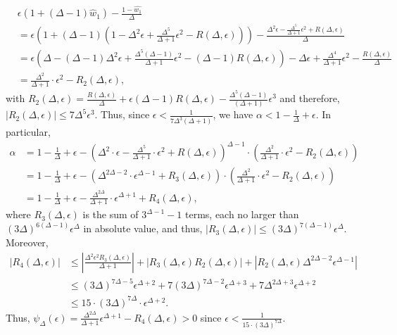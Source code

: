 \documentclass[11pt]{article}
\begin{document}
\begin{appendixproof}
\begin{align*}
&\epsilon(1+(\Delta-1)\hat{w}_1) - \frac{1-\hat{w_1}}{\Delta} \\
&= \epsilon\left(1 + (\Delta-1)\left(1 - \Delta^2\epsilon + \frac{\Delta^5}{\Delta+1}\epsilon^2 - R(\Delta,\epsilon)\right)\right) - \frac{\Delta^2\epsilon - \frac{\Delta^5}{\Delta+1}\epsilon^2 + R(\Delta,\epsilon)}{\Delta}\\
& = \epsilon\left(\Delta - (\Delta-1)\Delta^2\epsilon +\frac{\Delta^5(\Delta-1)}{\Delta+1}\epsilon^2 - (\Delta-1)R(\Delta,\epsilon) \right) - \Delta\epsilon + \frac{\Delta^4}{\Delta+1}\epsilon^2- \frac{R(\Delta,\epsilon)}{\Delta}\\
& =\frac{\Delta^2}{\Delta+1} \cdot \epsilon^2 - R_2(\Delta, \epsilon), 
\end{align*}
with $R_2(\Delta,\epsilon) = \frac{R(\Delta,\epsilon)}{\Delta} + \epsilon(\Delta-1)R(\Delta,\epsilon)  - \frac{\Delta^5(\Delta-1)}{(\Delta+1)}\epsilon^3$ and therefore, $|R_2(\Delta,\epsilon)|\leq 7\Delta^5\epsilon^3$.
Thus, since $\epsilon < \frac{1}{7\Delta^3(\Delta+1)}$, we have $\alpha < 1 -\frac{1}{\Delta} + \epsilon$. In particular,
\begin{align*}
\alpha &=  1 - \frac1{\Delta} + \epsilon - \left(\Delta^2 \cdot \epsilon - \frac{\Delta^5}{\Delta+1} \cdot \epsilon^2 + R(\Delta,\epsilon)\right)^{\Delta - 1} \cdot \left(\frac{\Delta^2}{\Delta+1} \cdot \epsilon^2 - R_2(\Delta,\epsilon)\right) \\
&=1 - \frac1{\Delta} + \epsilon - \left(\Delta^{2\Delta-2} \cdot \epsilon^{\Delta-1} +R_3(\Delta,\epsilon)\right) \cdot \left(\frac{\Delta^2}{\Delta+1} \cdot \epsilon^2 - R_2(\Delta,\epsilon)\right) \\
&= 1 - \frac1{\Delta} + \epsilon - \frac{\Delta^{2\Delta}}{\Delta+1} \cdot \epsilon^{\Delta+1} + R_4(\Delta,\epsilon),
\end{align*}
where $R_3(\Delta,\epsilon)$ is the sum of $3^{\Delta-1}-1$ terms, each no larger than $(3\Delta)^{6(\Delta-1)}\epsilon^{\Delta}$ in absolute value, and thus, $|R_3(\Delta,\epsilon)|\leq (3\Delta)^{7(\Delta-1)}\epsilon^\Delta$. Moreover,
\begin{align*}
|R_4(\Delta,\epsilon)| &\leq \left|\frac{\Delta^2 \epsilon^2 R_3(\Delta,\epsilon)}{\Delta+1}\right| + \left|R_3(\Delta,\epsilon)R_2(\Delta,\epsilon)\right| + \left|R_2(\Delta,\epsilon)\Delta^{2\Delta-2}\epsilon^{\Delta-1}\right|\\
& \leq (3\Delta)^{7\Delta-5}\epsilon^{\Delta+2} + 7(3\Delta)^{7\Delta-2}\epsilon^{\Delta+3} + 7\Delta^{2\Delta+3}\epsilon^{\Delta+2}\\
&\leq 15\cdot (3\Delta)^{7\Delta} \cdot \epsilon^{\Delta+2}.
\end{align*}
Thus, $\psi_\Delta(\epsilon) = \frac{\Delta^{2\Delta}}{\Delta+1} \epsilon^{\Delta+1} - R_4(\Delta,\epsilon)> 0$ since $\epsilon < \frac{1}{15\cdot (3\Delta)^{7\Delta}}$.
\end{appendixproof}
\end{document}
